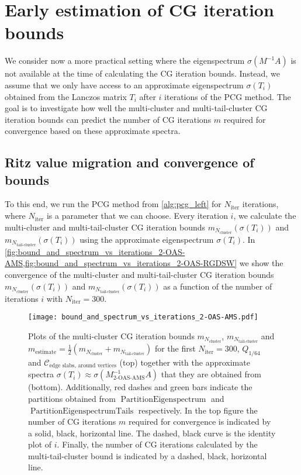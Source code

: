 \section{Early estimation of CG iteration bounds}\label{sec:early_estimation_of_iterations}
We consider now a more practical setting where the eigenspectrum $\sigma(M^{-1}A)$ is not available at the time of calculating the CG iteration bounds. Instead, we assume that we only have access to an approximate eigenspectrum $\sigma(T_i)$ obtained from the Lanczos matrix $T_i$ after $i$ iterations of the PCG method. The goal is to investigate how well the multi-cluster and multi-tail-cluster CG iteration bounds can predict the number of CG iterations $m$ required for convergence based on these approximate spectra.

\subsection{Ritz value migration and convergence of bounds}\label{sec:ritz_value_migration}
To this end, we run the PCG method from \cref{alg:pcg_left} for $N_{\text{iter}}$ iterations, where $N_{\text{iter}}$ is a parameter that we can choose. Every iteration $i$, we calculate the multi-cluster and multi-tail-cluster CG iteration bounds $m_{N_{\text{cluster}}}(\sigma(T_i))$ and $m_{N_{\text{tail-cluster}}}(\sigma(T_i))$ using the approximate eigenspectrum $\sigma(T_i)$. In \cref{fig:bound_and_spectrum_vs_iterations_2-OAS-AMS,fig:bound_and_spectrum_vs_iterations_2-OAS-RGDSW} we show the convergence of the multi-cluster and multi-tail-cluster CG iteration bounds $m_{N_{\text{cluster}}}(\sigma(T_i))$ and $m_{N_{\text{tail-cluster}}}(\sigma(T_i))$ as a function of the number of iterations $i$ with $N_{\text{iter}}=300$.
\begin{figure}[H]
    \centering
    \texttt{[image: bound\_and\_spectrum\_vs\_iterations\_2-OAS-AMS.pdf]}
    \caption{Plots of the multi-cluster CG iteration bounds $m_{N_{\text{cluster}}}$, $m_{N_{\text{tail-cluster}}}$ and $m_{\text{estimate}} = \frac{1}{2}(m_{N_{\text{cluster}}} + m_{N_{\text{tail-cluster}}})$ for the first $N_{\text{iter}}=300$, $Q_{1/64}$ and $\mathcal{C}_{\text{edge slabs, around vertices}}$ (top) together with the approximate spectra $\sigma(T_i) \approx \sigma(M^{-1}_{\text{2-OAS-AMS}}A)$ that they are obtained from (bottom). Additionally, red dashes and green bars indicate the partitions obtained from $\operatorname{PartitionEigenspectrum}$ and $\operatorname{PartitionEigenspectrumTails}$ respectively. In the top figure the number of CG iterations $m$ required for convergence is indicated by a solid, black, horizontal line. The dashed, black curve is the identity plot of $i$. Finally, the number of CG iterations calculated by the multi-tail-cluster bound is indicated by a dashed, black, horizontal line.}
    \label{fig:bound_and_spectrum_vs_iterations_2-OAS-AMS}
\end{figure}
